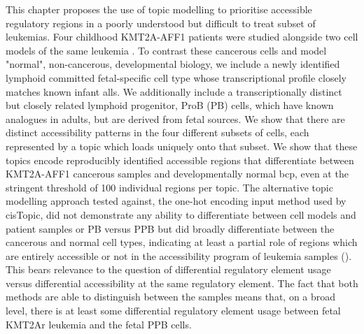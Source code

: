 






This chapter proposes the use of topic modelling to prioritise accessible regulatory regions in a poorly understood but difficult to treat subset of leukemias.  Four childhood KMT2A-AFF1 patients were studied alongside two cell models of the same leukemia . To contrast these cancerous cells and model "normal", non-cancerous, developmental biology, we include a newly identified lymphoid committed fetal-specific cell type whose transcriptional profile closely matches known infant \glspl{all}. We additionally include a transcriptionally distinct but closely related lymphoid progenitor, ProB (PB) cells, which have known analogues in adults, but are derived from fetal sources.  We show that there are distinct accessibility patterns in the four different subsets of cells, each represented by a topic which loads uniquely onto that subset. We show that these topics encode reproducibly identified accessible regions that differentiate between KMT2A-AFF1 cancerous samples and developmentally normal \gls{bcp}, even at the stringent threshold of 100 individual regions per topic. The alternative topic modelling approach tested against, the one-hot encoding input method used by cisTopic, did not demonstrate any ability to differentiate between cell models and patient samples or PB versus PPB but did broadly differentiate between the cancerous and normal cell types, indicating at least a partial role of regions which are entirely accessible or not in the accessibility program of leukemia samples (). This bears relevance to the question of differential regulatory element usage versus differential accessibility at the same regulatory element. The fact that both methods are able to distinguish between the samples means that, on a broad level, there is at least some differential regulatory element usage between fetal KMT2Ar leukemia and the fetal PPB cells. 

